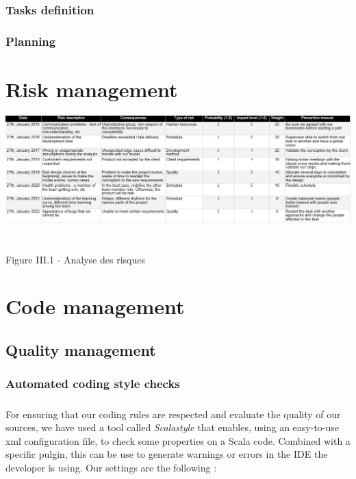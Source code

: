 \documentclass{report}
\begin{document}
\subsection{Tasks definition}

\subsection{Planning}


\chapter{Risk management}

%
\begin{center}
\includegraphics[scale=0.5]{data/risks.png}
~\\~\\Figure III.1 - Analyse des risques
\end{center}

\chapter{Code management}

\section{Quality management}

\subsection{Automated coding style checks}

\paragraph{}
\hspace{4mm}\textnormal{For ensuring that our coding rules are respected and evaluate the quality of our sources, we have
used a tool called \textit{Scalastyle} that enables, using an easy-to-use xml configuration file, to check
some properties on a Scala code. Combined with a specific pulgin, this can be use to generate warnings or errors
in the IDE the developer is using. Our settings are the following :}
\end{document}
